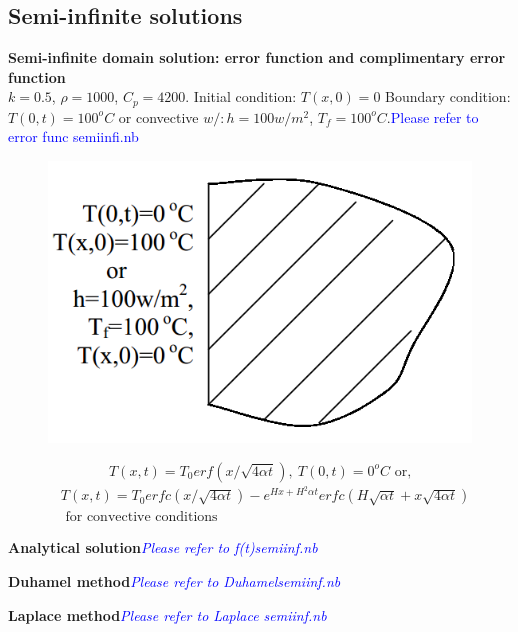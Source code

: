 \begin{appendices}
\subsection{Semi-infinite solutions}
\begin{example}
\textbf{Semi-infinite domain solution: error function and complimentary error
function}\\
$k = 0.5$, $\rho= 1000$, $C_p = 4200$.
Initial condition: $T(x,0)=0$
Boundary condition: $T(0,t)=100^oC$ or convective $w/:h=100w/m^2$, $T_f=100^oC$.\textcolor{blue} {Please refer to error func semiinfi.nb}
\begin{figure}[H]
  \centering
    \includegraphics[scale=0.5]{figures/appendixA/9}
\end{figure}
$$T(x,t)=T_0 erf(x/\sqrt{4\alpha t}),~T(0,t)=0^o C\text{ or,}$$
\begin{eqnarray*}
&T(x,t)=T_0 erfc(x/\sqrt{4\alpha t})-e^{Hx+H^2\alpha t}
erfc(H \sqrt{\alpha t}+x\sqrt{4\alpha t})\\
&\text{ for convective conditions}
\end{eqnarray*}
\end{example}

\begin{example}
\textbf{Analytical solution}\textcolor{blue} {\emph{Please refer to f(t)semiinf.nb}}
\end{example}

\begin{example}
\textbf{Duhamel method}\textcolor{blue} {\emph{Please refer to Duhamelsemiinf.nb}}
\end{example}

\begin{example}
\textbf{Laplace method}\textcolor{blue} {\emph{Please refer to Laplace semiinf.nb}}
\end{example}


\end{appendices}

